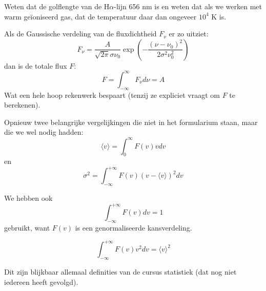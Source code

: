 \documentclass[a4paper,twoside]{article}
\theoremstyle{definition}
\theoremstyle{plain}
\begin{document}
Weten dat de golflengte van de H\(\alpha\)-lijn 656 nm is en weten dat als we werken met warm geïoniseerd gas, dat de temperatuur daar dan ongeveer \(10^4\) K is.

Als de Gaussische verdeling van de fluxdichtheid \(F_\nu\) er zo uitziet:
\[
F_\nu = \frac{A}{\sqrt{2 \pi} \sigma \nu_0} \exp \left( -\frac{(\nu - \nu_0)^2}{2 \sigma^2 \nu_0^2} \right)
\]
dan is de totale flux \(F\):
\[
F = \int_{-\infty}^{\infty} F_\nu d\nu = A
\]
Wat een hele hoop rekenwerk bespaart (tenzij ze expliciet vraagt om \(F\) te berekenen).

Opnieuw twee belangrijke vergelijkingen die niet in het formularium staan, maar die we wel nodig hadden:
\[
\langle v \rangle = \int_0^\infty  F (v) v dv
\]
en
\[
\sigma^2 = \int_{-\infty}^{+\infty} F(v) (v - \langle v \rangle)^2 dv
\]

We hebben ook
\[
\int_{-\infty}^{+\infty} F(v) dv = 1
\]
gebruikt, want \(F(v)\) is een genormaliseerde kansverdeling.

\[
\int_{-\infty}^{+\infty} F(v) v^2 dv = \langle v \rangle^2
\]

Dit zijn blijkbaar allemaal definities van de cursus statistiek (dat nog niet iedereen heeft gevolgd).
\end{document}
